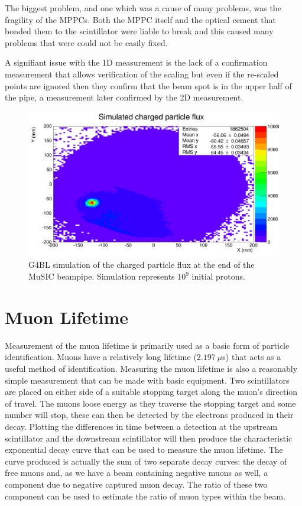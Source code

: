 The biggest problem, and one which was a cause of many problems, was the fragility of the MPPCs. Both the MPPC itself and the optical cement that bonded them to the scintillator were liable to break and this caused many problems that were could not be easily fixed. 

A signifiant issue with the 1D measurement is the lack of a confirmation measurement that allows verification of the scaling but even if the re-scaled points are ignored then they confirm that the beam spot is in the upper half of the pipe, a measurement later confirmed by the 2D measurement. 

\begin{figure}[hptb]
    \centering
        \includegraphics[width=.9\textwidth]{images/charged_flux/sim_2d_charged_particle_flux.png}
    \caption{G4BL simulation of the charged particle flux at the end of the MuSIC beampipe. Simulation represents \(10^9\) initial protons.}
    \label{fig:sim_2d_charged_particle_flux}
\end{figure}

\chapter{Muon Lifetime} %
\label{cha:muon_lifetime}
Measurement of the muon lifetime is primarily used as a basic form of particle identification. Muons have a relatively long lifetime (\(2.197~\mu\)s) that acts as a useful method of identification. Measuring the muon lifetime is also a reasonably simple measurement that can be made with basic equipment. Two scintillators are placed on either side of a suitable stopping target along the muon's direction of travel. The muons loose energy as they traverse the stopping target and some number will stop, these can then be detected by the electrons produced in their decay. Plotting the differences in time between a detection at the upstream scintillator and the downstream scintillator will then produce the characteristic exponential decay curve that can be used to measure the muon lifetime. The curve produced is actually the sum of two separate decay curves: the decay of free muons and, as we have a beam containing negative muons as well, a component due to negative captured muon decay. The ratio of these two component can be used to estimate the ratio of muon types within the beam.

